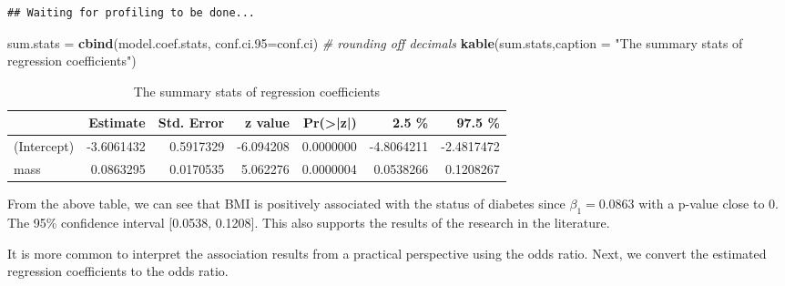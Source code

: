 \documentclass[
]{book}
\newenvironment{Shaded}{\begin{snugshade}}{\end{snugshade}}
\newcommand{\AttributeTok}[1]{\textcolor[rgb]{0.13,0.29,0.53}{#1}}
\newcommand{\CommentTok}[1]{\textcolor[rgb]{0.56,0.35,0.01}{\textit{#1}}}
\newcommand{\FunctionTok}[1]{\textcolor[rgb]{0.13,0.29,0.53}{\textbf{#1}}}
\newcommand{\NormalTok}[1]{#1}
\newcommand{\OtherTok}[1]{\textcolor[rgb]{0.56,0.35,0.01}{#1}}
\newcommand{\SpecialCharTok}[1]{\textcolor[rgb]{0.81,0.36,0.00}{\textbf{#1}}}
\newcommand{\StringTok}[1]{\textcolor[rgb]{0.31,0.60,0.02}{#1}}
\begin{document}
\begin{Shaded}
\end{Shaded}

\begin{verbatim}
## Waiting for profiling to be done...
\end{verbatim}

\begin{Shaded}
\begin{Highlighting}[]
\NormalTok{sum.stats }\OtherTok{=} \FunctionTok{cbind}\NormalTok{(model.coef.stats, }\AttributeTok{conf.ci.95=}\NormalTok{conf.ci)   }\CommentTok{\# rounding off decimals}
\FunctionTok{kable}\NormalTok{(sum.stats,}\AttributeTok{caption =} \StringTok{"The summary stats of regression coefficients"}\NormalTok{)  }
\end{Highlighting}
\end{Shaded}

\begin{table}

\caption{\label{tab:unnamed-chunk-112}The summary stats of regression coefficients}
\centering
\begin{tabular}[t]{l|r|r|r|r|r|r}
\hline
  & Estimate & Std. Error & z value & Pr(>|z|) & 2.5 \% & 97.5 \%\\
\hline
(Intercept) & -3.6061432 & 0.5917329 & -6.094208 & 0.0000000 & -4.8064211 & -2.4817472\\
\hline
mass & 0.0863295 & 0.0170535 & 5.062276 & 0.0000004 & 0.0538266 & 0.1208267\\
\hline
\end{tabular}
\end{table}

From the above table, we can see that BMI is positively associated with the status of diabetes since \(\beta_1 = 0.0863\) with a p-value close to 0. The 95\% confidence interval {[}0.0538, 0.1208{]}. This also supports the results of the research in the literature.

It is more common to interpret the association results from a practical perspective using the odds ratio. Next, we convert the estimated regression coefficients to the odds ratio.
\end{document}
